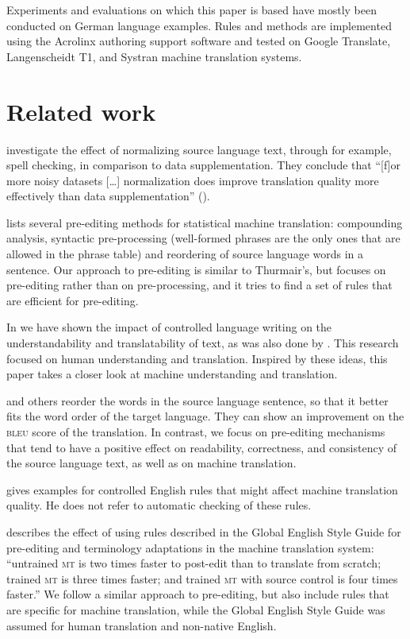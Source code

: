 \documentclass[output=paper]{LSP/langsci}
\begin{document}
Experiments and evaluations on which this paper is based have mostly been conducted on German language examples. Rules and methods are implemented using the Acrolinx authoring support software and tested on Google Translate, Langenscheidt T1, and Systran machine translation systems.

\section{Related work}\label{sec:siegel:2}

\citet{BanerjeeEtAl2012} investigate the effect of normalizing source language text, through for example, spell checking, in comparison to data supplementation. They conclude that ``[f]or more noisy datasets [\ldots] normalization does improve translation quality more effectively than data supplementation'' (\citeyear[175]{BanerjeeEtAl2012}). 

\citet{Thurmair2009} lists several pre-editing methods for statistical machine translation: compounding analysis, syntactic pre-processing (well-formed phrases are the only ones that are allowed in the phrase table) and reordering of source language words in a sentence. Our approach to pre-editing is similar to Thurmair's, but focuses on pre-editing rather than on pre-processing, and it tries to find a set of rules that are efficient for pre-editing.

In \citet{Siegel2011} we have shown the impact of controlled language writing on the understandability and translatability of text, as was also done by \citet{Reuther2003}. This research focused on human understanding and translation. Inspired by these ideas, this paper takes a closer look at machine understanding and translation.

\newpage 
\citet{Genzel2010} and others reorder the words in the source language sentence, so that it better fits the word order of the target language. They can show an improvement on the \textsc{bleu} score of the translation. In contrast, we focus on pre-editing mechanisms that tend to have a positive effect on readability, correctness, and consistency of the source language text, as well as on machine translation.

\citet{Hutchins2005} gives examples for controlled English rules that might affect machine translation quality. He does not refer to automatic checking of these rules. 

\citet{Thicke2011} describes the effect of using rules described in the Global English Style Guide \citep{Kohl2008} for pre-editing and terminology adaptations in the machine translation system: ``untrained \textsc{mt} is two times faster to post-edit than to translate from scratch; trained \textsc{mt} is three times faster; and trained \textsc{mt} with source control is four times faster.'' We follow a similar approach to pre-editing, but also include rules that are specific for machine translation, while the Global English Style Guide was assumed for human translation and non-native English.
\end{document}
